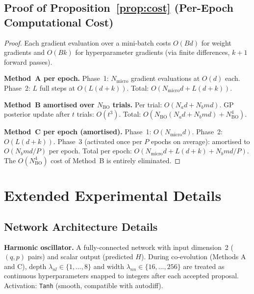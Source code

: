 \documentclass[11pt]{article}
\theoremstyle{definition}
\begin{document}
\subsection{Proof of Proposition~\ref{prop:cost} (Per-Epoch Computational Cost)}

\begin{proof}
Each gradient evaluation over a mini-batch costs $O(Bd)$
for weight gradients and $O(Bk)$ for hyperparameter gradients
(via finite differences, $k+1$ forward passes).

\textbf{Method~A per epoch.}
Phase~1: $N_{\mathrm{micro}}$ gradient evaluations at $O(d)$ each.
Phase~2: $L$ full steps at $O(L(d+k))$.
Total: $O(N_{\mathrm{micro}}d + L(d+k))$.

\textbf{Method~B amortised over $N_{\mathrm{BO}}$ trials.}
Per trial: $O(N_a d + N_b md)$.
GP posterior update after $t$ trials: $O(t^3)$.
Total: $O\!\left(N_{\mathrm{BO}}(N_a d + N_b md) + N_{\mathrm{BO}}^4\right)$.

\textbf{Method~C per epoch (amortised).}
Phase~1: $O(N_{\mathrm{micro}}d)$.
Phase~2: $O(L(d+k))$.
Phase~3 (activated once per $P$ epochs on average):
amortised to $O(N_b md/P)$ per epoch.
Total per epoch: $O(N_{\mathrm{micro}}d + L(d+k) + N_b md/P)$.
The $O(N_{\mathrm{BO}}^4)$ cost of Method~B is
entirely eliminated.
\end{proof}


\section{Extended Experimental Details}
\label{app:experimental}

\subsection{Network Architecture Details}

\textbf{Harmonic oscillator.}
A fully-connected network with input dimension~2 ($(q,p)$ pairs)
and scalar output (predicted $H$). During co-evolution (Methods A
and C), depth $\lambda_{nl} \in \{1,\ldots,8\}$ and width
$\lambda_{nn} \in \{16,\ldots,256\}$ are treated as continuous
hyperparameters snapped to integers after each accepted proposal.
Activation: \texttt{Tanh} (smooth, compatible with autodiff).
\end{document}
